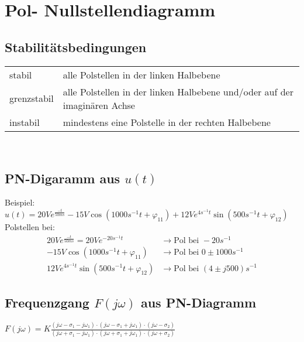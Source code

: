 \section{Pol- Nullstellendiagramm}
\subsection{Stabilitätsbedingungen}
\begin{tabular}{ll}
	stabil & alle Polstellen in der linken Halbebene\\
	grenzstabil & alle Polstellen in der linken Halbebene und/oder auf der
	imaginären Achse\\
	instabil & mindestens eine Polstelle in der rechten Halbebene
\end{tabular}\\

\subsection{PN-Digaramm aus $u(t)$}
Beispiel:
$u(t)=20Ve^{\frac{-t}{50ms}}-15V\cos(1000s^{-1}t+\varphi_{11})+12Ve^{4s^{-1}t}\sin(500s^{-1}t+\varphi_{12})$\\
Polstellen bei: \\
\begin{align}
	20Ve^{\frac{-t}{50ms}} = 20Ve^{-20s^{-1}t} &\rightarrow \text{Pol bei }
	-20s^{-1}\nonumber\\
	-15V\cos(1000s^{-1}t+\varphi_{11}) &\rightarrow \text{Pol bei }
	0\pm1000s^{-1}\nonumber\\
	12Ve^{4s^{-1}t}\sin(500s^{-1}t+\varphi_{12}) &\rightarrow \text{Pol bei } (4\pm
	j500)s^{-1}\nonumber
\end{align}



\subsection{Frequenzgang $F(j\omega)$ aus PN-Diagramm}

$F(j\omega)=K\frac{(j\omega-\sigma_1-j\omega_1)\cdot(j\omega-\sigma_1+j\omega_1)\cdot(j\omega-\sigma_2)}{(j\omega+\sigma_1-j\omega_1)\cdot(j\omega+\sigma_1+j\omega_1)\cdot(j\omega+\sigma_2)}$
